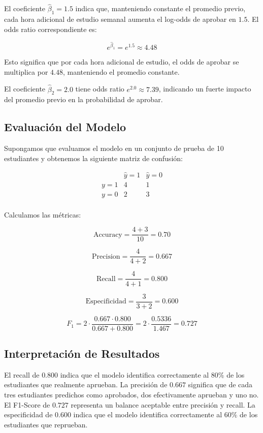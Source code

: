 \documentclass[12pt]{article}
\begin{document}
El coeficiente $\hat{\beta}_1 = 1.5$ indica que, manteniendo constante el promedio previo, cada hora adicional de estudio semanal aumenta el log-odds de aprobar en $1.5$. El odds ratio correspondiente es:

\[
e^{\hat{\beta}_1} = e^{1.5} \approx 4.48
\]

Esto significa que por cada hora adicional de estudio, el odds de aprobar se multiplica por $4.48$, manteniendo el promedio constante.

El coeficiente $\hat{\beta}_2 = 2.0$ tiene odds ratio $e^{2.0} \approx 7.39$, indicando un fuerte impacto del promedio previo en la probabilidad de aprobar.

\subsection{Evaluación del Modelo}

Supongamos que evaluamos el modelo en un conjunto de prueba de 10 estudiantes y obtenemos la siguiente matriz de confusión:

\[
\begin{array}{c|cc}
 & \hat{y}=1 & \hat{y}=0 \\
\hline
y=1 & 4 & 1 \\
y=0 & 2 & 3 \\
\end{array}
\]

Calculamos las métricas:

\[
\text{Accuracy} = \frac{4+3}{10} = 0.70
\]

\[
\text{Precision} = \frac{4}{4+2} = 0.667
\]

\[
\text{Recall} = \frac{4}{4+1} = 0.800
\]

\[
\text{Especificidad} = \frac{3}{3+2} = 0.600
\]

\[
F_1 = 2 \cdot \frac{0.667 \cdot 0.800}{0.667 + 0.800} = 2 \cdot \frac{0.5336}{1.467} = 0.727
\]

\subsection{Interpretación de Resultados}

El recall de $0.800$ indica que el modelo identifica correctamente al $80\%$ de los estudiantes que realmente aprueban. La precisión de $0.667$ significa que de cada tres estudiantes predichos como aprobados, dos efectivamente aprueban y uno no. El F1-Score de $0.727$ representa un balance aceptable entre precisión y recall. La especificidad de $0.600$ indica que el modelo identifica correctamente al $60\%$ de los estudiantes que reprueban.
\end{document}
